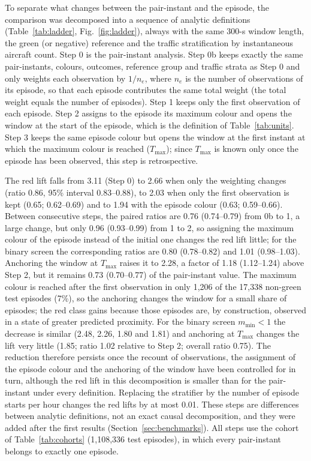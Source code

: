 \documentclass[aerospace,article,submit,moreauthors]{Definitions/mdpi}
\newcommand{\mmin}{m_{\min}}
\begin{document}
To separate what changes between the pair-instant and the episode, the comparison was decomposed into a sequence of analytic definitions (Table~\ref{tab:ladder}, Fig.~\ref{fig:ladder}), always with the same 300-s window length, the green (or negative) reference and the traffic stratification by instantaneous aircraft count. Step 0 is the pair-instant analysis. Step 0b keeps exactly the same pair-instants, colours, outcomes, reference group and traffic strata as Step 0 and only weights each observation by $1/n_e$, where $n_e$ is the number of observations of its episode, so that each episode contributes the same total weight (the total weight equals the number of episodes). Step 1 keeps only the first observation of each episode. Step 2 assigns to the episode its maximum colour and opens the window at the start of the episode, which is the definition of Table~\ref{tab:units}. Step 3 keeps the same episode colour but opens the window at the first instant at which the maximum colour is reached ($T_{\max}$); since $T_{\max}$ is known only once the episode has been observed, this step is retrospective.

The red lift falls from 3.11 (Step 0) to 2.66 when only the weighting changes (ratio 0.86, 95\% interval 0.83--0.88), to 2.03 when only the first observation is kept (0.65; 0.62--0.69) and to 1.94 with the episode colour (0.63; 0.59--0.66). Between consecutive steps, the paired ratios are 0.76 (0.74--0.79) from 0b to 1, a large change, but only 0.96 (0.93--0.99) from 1 to 2, so assigning the maximum colour of the episode instead of the initial one changes the red lift little; for the binary screen the corresponding ratios are 0.80 (0.78--0.82) and 1.01 (0.98--1.03). Anchoring the window at $T_{\max}$ raises it to 2.28, a factor of 1.18 (1.12--1.24) above Step 2, but it remains 0.73 (0.70--0.77) of the pair-instant value. The maximum colour is reached after the first observation in only 1,206 of the 17,338 non-green test episodes (7\%), so the anchoring changes the window for a small share of episodes; the red class gains because those episodes are, by construction, observed in a state of greater predicted proximity. For the binary screen $\mmin<1$ the decrease is similar (2.48, 2.26, 1.80 and 1.81) and anchoring at $T_{\max}$ changes the lift very little (1.85; ratio 1.02 relative to Step 2; overall ratio 0.75). The reduction therefore persists once the recount of observations, the assignment of the episode colour and the anchoring of the window have been controlled for in turn, although the red lift in this decomposition is smaller than for the pair-instant under every definition. Replacing the stratifier by the number of episode starts per hour changes the red lifts by at most 0.01. These steps are differences between analytic definitions, not an exact causal decomposition, and they were added after the first results (Section~\ref{sec:benchmarks}). All steps use the cohort of Table~\ref{tab:cohorts} (1,108,336 test episodes), in which every pair-instant belongs to exactly one episode.
\end{document}
